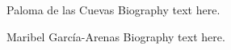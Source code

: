 \documentclass[journal,transmag]{IEEEtran}
\begin{document}
\begin{IEEEbiographynophoto}{Paloma de las Cuevas}
Biography text here.
\end{IEEEbiographynophoto}

\begin{IEEEbiographynophoto}{Maribel Garc\'{i}a-Arenas}
Biography text here.
\end{IEEEbiographynophoto}






\end{document}
